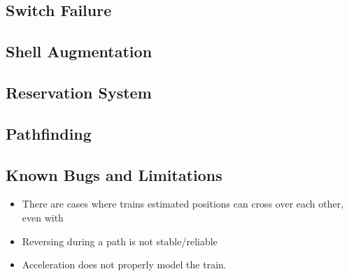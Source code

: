 \documentclass{article}
\begin{document}
\subsection{Switch Failure}

\subsection{Shell Augmentation}

\subsection{Reservation System}

\subsection{Pathfinding}

\subsection{Known Bugs and Limitations}
\begin{itemize}
\item There are cases where trains estimated positions can cross over each other, even with 
\item Reversing during a path is not stable/reliable
\item Acceleration does not properly model the train.
\end{itemize}
\end{document}
